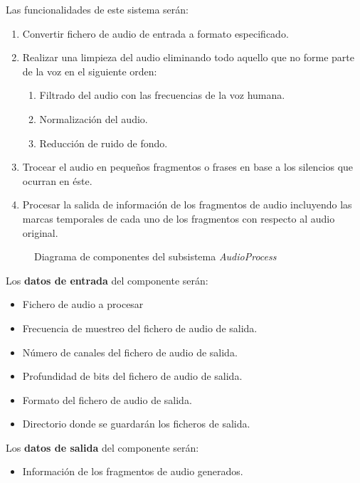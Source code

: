 \documentclass[../main.tex]{subfiles}
\begin{document}
Las funcionalidades de este sistema serán:
\begin{enumerate}
    \item Convertir fichero de audio de entrada a formato especificado.
    \item Realizar una limpieza del audio eliminando todo aquello que no forme parte de la voz en el siguiente orden:
    \begin{enumerate}[label=\theenumi.\arabic*]
        \item Filtrado del audio con las frecuencias de la voz humana.
        \item Normalización del audio.
        \item Reducción de ruido de fondo.
    \end{enumerate}
    \item Trocear el audio en pequeños fragmentos o frases en base a los silencios que ocurran en éste.
    \item Procesar la salida de información de los fragmentos de audio incluyendo las marcas temporales de cada uno de los fragmentos con respecto al audio original.
\end{enumerate}

\begin{figure}[H]
    \centering
    
    \label{fig:components_audioprocess}
    \caption{Diagrama de componentes del subsistema \textit{AudioProcess}}
\end{figure}

Los \textbf{datos de entrada} del componente serán:
\begin{itemize}
    \item Fichero de audio a procesar
    \item Frecuencia de muestreo del fichero de audio de salida.    
    \item Número de canales del fichero de audio de salida.
    \item Profundidad de bits del fichero de audio de salida.
    \item Formato del fichero de audio de salida.
    \item Directorio donde se guardarán los ficheros de salida.
\end{itemize}

Los \textbf{datos de salida} del componente serán:
\begin{itemize}
    \item Información de los fragmentos de audio generados.
\end{itemize}
\end{document}
